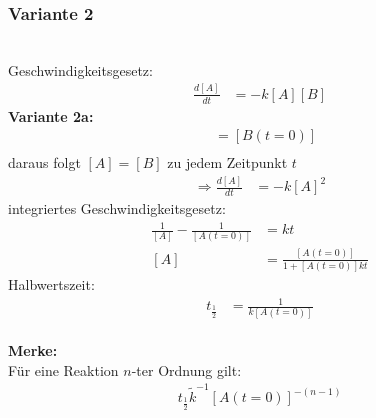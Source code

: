 \documentclass[a4paper, fleqn]{article}
\begin{document}
\subsubsection*{Variante 2}
\\
Geschwindigkeitsgesetz:\\
\begin{align*}
    \frac{d[A]}{dt} &= - k[A][B]
\end{align*}
\textbf{Variante 2a:}\\
\begin{align*}
    [A(t=0)] &= [B(t=0)]\\
\end{align*}
daraus folgt $[A]=[B]$ zu jedem Zeitpunkt $t$\\
\begin{align*}
    \Rightarrow \frac{d[A]}{dt} &= -k[A]^2
\end{align*}
integriertes Geschwindigkeitsgesetz:\\
\begin{align*}
    \frac{1}{[A]}-\frac{1}{[A(t=0)]} &= kt\\
    [A] &= \frac{[A(t=0)]}{1+[A(t=0)]kt}
\end{align*}
Halbwertszeit:\\
\begin{align*}
    t_\frac{1}{2} &= \frac{1}{k[A(t=0)]}
\end{align*}\\

\textbf{Merke:}\\
Für eine Reaktion  $n$-ter Ordnung gilt:\\
\begin{align*}
    t_\frac{1}{2} \tilde k^{-1}[A(t=0)]^{-(n-1)}
\end{align*}\\
\end{document}
